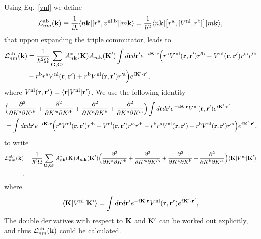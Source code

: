 \documentclass[floatfix,prb,aps,superscriptaddress,11pt,preprint,letterpaper]{revtex4}
\begin{document}
\label{calt}
Using Eq.~\eqref{vnl} we define
\begin{align}\label{3.1}
{\cal L}^{\mathrm{a}\mathrm{b}}_{nm}(\mathbf{k}) 
\equiv\frac{1}{i\hbar}
\langle n\mathbf{k} |
[ r^{\mathrm{a}}, v^{\mathrm{nl},\mathrm{b}}]
| m\mathbf{k} \rangle
=
\frac{1}{\hbar^2}
\langle n\mathbf{k} |
\big[ r^{\mathrm{a}},[ V^{\mathrm{nl}}, r^{\mathrm{b}}]\big]
| m\mathbf{k} \rangle
,
\end{align} 
that uppon expanding the triple commutator, leads to
\begin{align}\label{3.5}
{\cal L}^{\mathrm{a}\mathrm{b}}_{nm}(\mathbf{k}) 
&=
\frac{1}{\hbar^2\Omega}
\sum_{\mathbf{G},\mathbf{G}'} 
A^*_{n\mathbf{k}}(\mathbf{K}) 
A_{m\mathbf{k}}(\mathbf{K}')
\int
d\mathbf{r} d\mathbf{r}'
 e^{-i\mathbf{K}\cdot\mathbf{r}}
\Big(
r^{\mathrm{a}}
V^{\mathrm{nl}}(\mathbf{r},\mathbf{r}')
r'^{\mathrm{b}}
-
V^{\mathrm{nl}}(\mathbf{r},\mathbf{r}')
r'^{\mathrm{a}}
r'^{\mathrm{b}}
\nonumber\\
&-
r^{\mathrm{b}}
r^{\mathrm{a}}
V^{\mathrm{nl}}(\mathbf{r},\mathbf{r}')
+
 r^{\mathrm{b}}
V^{\mathrm{nl}}(\mathbf{r},\mathbf{r}')
r'^{\mathrm{a}}
\Big) 
 e^{i\mathbf{K}'\cdot\mathbf{r}'}
,
\end{align} 
where 
$V^{\mathrm{nl}}(\mathbf{r},\mathbf{r}') = \langle \mathbf{r} | V^{\mathrm{nl}}| \mathbf{r}' \rangle$.
We use the following identity
\begin{align}\label{3.4}
&
\Big(
\frac{\partial^2}{\partial K^{\mathrm{a}}\partial K'^{\mathrm{b}}}
+
\frac{\partial^2}{\partial K'^{\mathrm{a}}\partial K'^{\mathrm{b}}}
+
\frac{\partial^2}{\partial K^{\mathrm{a}}\partial K^{\mathrm{b}}}
+
\frac{\partial^2}{\partial K^{\mathrm{b}}\partial K'^{\mathrm{a}}}
\Big)
\int 
d\mathbf{r} d\mathbf{r}' 
 e^{-i\mathbf{K}\cdot\mathbf{r}}
V^{\mathrm{nl}}(\mathbf{r},\mathbf{r}') 
e^{i\mathbf{K}'\cdot\mathbf{r}'}
\nonumber\\
&=
\int d\mathbf{r} d\mathbf{r}'
 e^{-i\mathbf{K}\cdot\mathbf{r}}
\Big( 
r^{\mathrm{a}} 
V^{\mathrm{nl}}(\mathbf{r},\mathbf{r}') 
r'^{\mathrm{b}}
- 
V^{\mathrm{nl}}(\mathbf{r},\mathbf{r}') 
r'^{\mathrm{a}} 
r'^{\mathrm{b}}
- 
r^{\mathrm{b}} 
r^{\mathrm{a}} 
V^{\mathrm{nl}}(\mathbf{r},\mathbf{r}')
+
 r^{\mathrm{b}} 
V^{\mathrm{nl}}(\mathbf{r},\mathbf{r}') 
r'^{\mathrm{a}}
\Big)  
e^{i\mathbf{K}'\cdot\mathbf{r}'}
,
\end{align}
to write
\begin{align}\label{3.7}
{\cal L}^{\mathrm{a}\mathrm{b}}_{nm}(\mathbf{k})
&=
\frac{1}{\hbar^2\Omega}
\sum_{\mathbf{G},\mathbf{G}'} 
A^*_{n\mathbf{k}}(\mathbf{K}) 
A_{m\mathbf{k}}(\mathbf{K}')
\Big(
\frac{\partial^2}{\partial K^{\mathrm{a}}\partial K'^{\mathrm{b}}}
+
\frac{\partial^2}{\partial K'^{\mathrm{a}}\partial K'^{\mathrm{b}}}
+
\frac{\partial^2}{\partial K^{\mathrm{a}}\partial K^{\mathrm{b}}}
+
\frac{\partial^2}{\partial K^{\mathrm{b}}\partial K'^{\mathrm{a}}}
\Big)
\langle \mathbf{K} | 
V^{\mathrm{nl}} 
| \mathbf{K}' \rangle 
\nonumber\\
,
\end{align} 
where
\begin{align}\label{vkk}
\langle \mathbf{K} | 
V^{\mathrm{nl}} 
| \mathbf{K}' \rangle 
=
\int 
d\mathbf{r} d\mathbf{r}' 
 e^{-i\mathbf{K}\cdot\mathbf{r}}
V^{\mathrm{nl}}(\mathbf{r},\mathbf{r}') 
e^{i\mathbf{K}'\cdot\mathbf{r}'}
,
\end{align}
The double derivatives with respect to $\mathbf{K}$ and $\mathbf{K}'$ 
can be worked out explicitly, and thus ${\cal L}^{\mathrm{a}\mathrm{b}}_{nm}(\mathbf{k})$
could be calculated.\cite{valerie}
\end{document}
